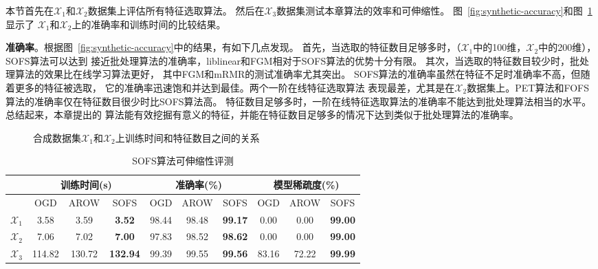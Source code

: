 \documentclass[doctor]{ustcthesis}
\def \X {\mathcal{X}}
\newcommand{\includeMyGraphicX}[1]{\texttt{[image: \#1]}}
\begin{document}
本节首先在$\X_1$和$\X_2$数据集上评估所有特征选取算法。
然后在$\X_3$数据集测试本章算法的效率和可伸缩性。
图~\ref{fig:synthetic-accuracy}和图~\ref{fig:synthetic-time}显示了
$\X_1$和$\X_2$上的准确率和训练时间的比较结果。

\textbf{准确率}。根据图~\ref{fig:synthetic-accuracy}中的结果，有如下几点发现。
首先，当选取的特征数目足够多时，（$\X_1$中的100维，$\X_2$中的200维），SOFS算法可以达到
接近批处理算法的准确率，liblinear和FGM相对于SOFS算法的优势十分有限。
其次，当选取的特征数目较少时，批处理算法的效果比在线学习算法更好，
其中FGM和mRMR的测试准确率尤其突出。
SOFS算法的准确率虽然在特征不足时准确率不高，但随着更多的特征被选取，
它的准确率迅速饱和并达到最佳。两个一阶在线特征选取算法
表现最差，尤其是在$\X_2$数据集上。PET算法和FOFS算法的准确率仅在特征数目很少时比SOFS算法高。
特征数目足够多时，一阶在线特征选取算法的准确率不能达到批处理算法相当的水平。总结起来，本章提出的
算法能有效挖掘有意义的特征，并能在特征数目足够多的情况下达到类似于批处理算法的准确率。


\begin{figure}[t]
    \centerline{
        \subfigure[dataset $\X_1$]{ \includeMyGraphicX{synthetic-100k-fs-train-time.pdf} }
        \subfigure[dataset $\X_2$]{ \includeMyGraphicX{synthetic-200k-fs-train-time.pdf} }
    }
    \caption{合成数据集$\X_1$和$\X_2$上训练时间和特征数目之间的关系}
    \label{fig:synthetic-time}
    \vspace{-1em}
\end{figure}

\begin{table}[t]
    \centering
    \caption{SOFS算法可伸缩性评测}
    \label{tab:sofs-scalability}
    \begin{tabular}{|c|c|c|c|c|c|c|c|c|c|}
        \hline
        & \multicolumn{3}{c|}{训练时间(s)} & \multicolumn{3}{c|}{准确率(\%)}
        & \multicolumn{3}{c|}{模型稀疏度(\%)} \\
        \hline
        & OGD & AROW & SOFS & OGD & AROW & SOFS & OGD & AROW & SOFS \\ \hline
        $\X_1$ & 3.58 & 3.59 & \textbf{3.52} & 98.44 & 98.48 & \textbf{99.17} & 0.00 & 0.00 & \textbf{99.00} \\ \hline
        $\X_2$ & 7.06 & 7.02 & \textbf{7.00} & 97.83 & 98.52 & \textbf{98.62} & 0.00 & 0.00 & \textbf{99.00} \\ \hline
        $\X_3$ & 114.82 & 130.72 & \textbf{132.94} & 99.39 & 99.55 &
        \textbf{99.56} & 83.16 & 72.22 & \textbf{99.99} \\ \hline
    \end{tabular}
\end{table}
\end{document}
